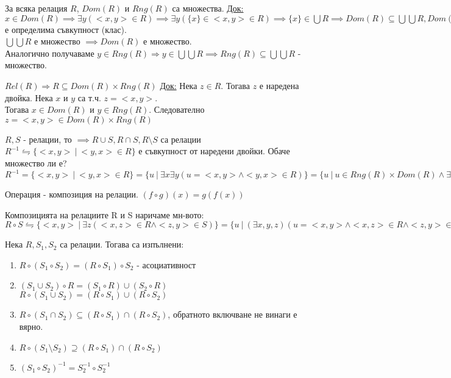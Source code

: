 \documentclass[fleqn, titlepage, 12pt]{report}
\begin{document}
 За всяка релация $R$, $Dom(R)$ и $Rng(R)$ са множества.
\bigbreak
\underline{Док:} $x \in Dom(R) \implies \exists{y}(<x,y> \in R) \implies \exists{y}( \{ x\} \in <x,y> \in R)
\implies \{ x\} \in \bigcup R \implies Dom(R) \subseteq \bigcup \bigcup R, Dom(R)$ е определима съвкупност (клас).\\
$\bigcup \bigcup R$ е множество $ \implies Dom(R)$ е множество.\\
Аналогично получаваме
$y \in Rng(R) \Rightarrow y \in \bigcup \bigcup R \implies Rng(R) \subseteq \bigcup \bigcup R$ - множество.
\bigbreak

 $Rel(R) \Rightarrow R \subseteq Dom(R) \times Rng(R)$
\bigbreak
\underline{Док:} Нека $z \in R$. Тогава $z$ е наредена двойка. Нека $x$ и $y$ са т.ч. $z = <x,y>$.\\
Тогава $x \in Dom(R)$ и $y \in Rng(R)$. Следователно $z = <x,y> \in Dom(R) \times Rng(R)$
\bigbreak

 $R,S$ - релации, то $\implies R \cup S, R \cap S, R \setminus S$ са релации\\
$R^{-1} \leftrightharpoons \{<x,y>\ |\ <y,x> \in R\}$ е съвкупност от наредени двойки. Обаче множество ли е?\\
$R^{-1} = \{<x,y>\ |\ <y,x> \in R\} = \{u\ |\ \exists{x}\exists{y}(u = <x,y> \land <y,x> \in R)\}
= \{u\ |\ u \in Rng(R) \times Dom(R) \land \exists{x,y}(u = <x,y> \land <y,x> \in R)\}$
\bigbreak

 Операция - композиция на релации. $(f \circ g)(x) = g(f(x))$
\bigbreak

 Композицията на релациите R и S наричаме мн-вото:\\
$R \circ S \leftrightharpoons \{<x,y>\ |\ \exists{z}(<x,z> \in R \land <z,y> \in S)\}
= \{u\ |\ (\exists{x,y,z})(u = <x,y> \land <x,z> \in R \land <z,y> \in S)\}
= \{u\ |\ u \in Dom(R) \times Rng(S) \land (\exists{x,y,z})(u = <x,y> \land <x,z> \in R \land <z,y> \in S)\}$
\bigbreak

 Нека $R, S_1, S_2$ са релации. Тогава са изпълнени:
\begin{enumerate}
  \item $R\circ (S_1\circ S_2) = (R\circ S_1)\circ S_2$ - асоциативност
  \item $(S_1 \cup S_2)\circ R = (S_1\circ R) \cup (S_2\circ R)$\\
    $R \circ (S_1 \cup S_2) = (R \circ S_1) \cup (R \circ S_2)$
  \item $R \circ (S_1 \cap S_2) \subseteq (R \circ S_1) \cap (R \circ S_2)$, обратното включване не винаги е вярно.
  \item $R \circ (S_1 \setminus S_2) \supseteq (R \circ S_1) \cap (R \circ S_2)$
  \item $(S_1 \circ S_2)^{-1} = S_2^{-1} \circ S_2^{-1}$
\end{enumerate}
\bigbreak
\end{document}
